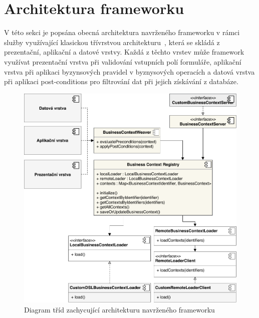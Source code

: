 \section{Architektura frameworku}\label{sec:architecture}

V této sekci je popsána obecná architektura navrženého frameworku v rámci služby využívající
klasickou třívrstvou architekturu~\cite{fowler2002patterns}, která se skládá z prezentační,
aplikační a datové vrstvy. Každá z těchto vrstev může framework využívat
\textendash\xspace prezentační vrstva při validování vstupních polí formuláře, aplikační vrstva při
aplikaci byzynsových pravidel v byznysových operacích a datová vrstva při aplikaci post-conditions pro
filtrování dat při jejich získávání z databáze.

\begin{figure}
    \centering
    \includegraphics[keepaspectratio=true, width=\linewidth]{figures/business-context-registry.pdf}
    \caption{Diagram tříd zachycující architekturu navrženého frameworku}
    \label{fig:business-context-registry}
\end{figure}

